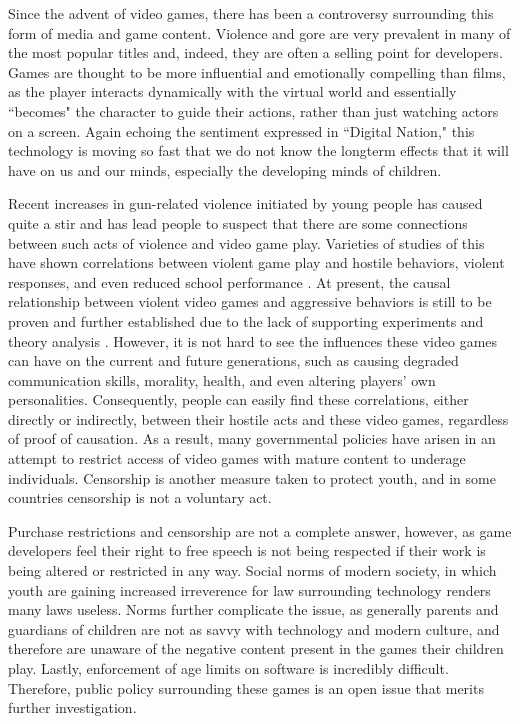 

\indent\indent Since the advent of video games, there has been a controversy surrounding this form of media and game content. Violence and gore are very prevalent in many of the most popular titles and, indeed, they are often a selling point for developers. Games are thought to be more influential and emotionally compelling than films, as the player interacts dynamically with the virtual world and essentially ``becomes" the character to guide their actions, rather than just watching actors on a screen. Again echoing the sentiment expressed in ``Digital Nation," this technology is moving so fast that we do not know the longterm effects that it will have on us and our minds, especially the developing minds of children.

Recent increases in gun-related violence initiated by young people has caused quite a stir and has lead people to suspect that there are some connections between such acts of violence and video game play. Varieties of studies of this have shown correlations between violent game play and hostile behaviors, violent responses, and even reduced school performance \cite{barlett2009, gentile2004, anderson2003}. At present, the causal relationship between violent video games and aggressive behaviors is still to be proven and further established due to the lack of supporting experiments and theory analysis \cite{erguson2013, ferguson2008,makuch2013,markey2014}. However, it is not hard to see the influences these video games can have on the current and future generations, such as causing degraded communication skills, morality, health, and even altering players' own personalities. Consequently, people can easily find these correlations, either directly or indirectly, between their hostile acts and these video games, regardless of proof of causation. As a result, many governmental policies have arisen in an attempt to restrict access of video games with mature content to underage individuals. Censorship is another measure taken to protect youth, and in some countries censorship is not a voluntary act.

Purchase restrictions and censorship are not a complete answer, however, as game developers feel their right to free speech is not being respected if their work is being altered or restricted in any way. Social norms of modern society, in which youth are gaining increased irreverence for law surrounding technology renders many laws useless. Norms further complicate the issue, as generally parents and guardians of children are not as savvy with technology and modern culture, and therefore are unaware of the negative content present in the games their children play. Lastly, enforcement of age limits on software is incredibly difficult. Therefore, public policy surrounding these games is an open issue that merits further investigation.


